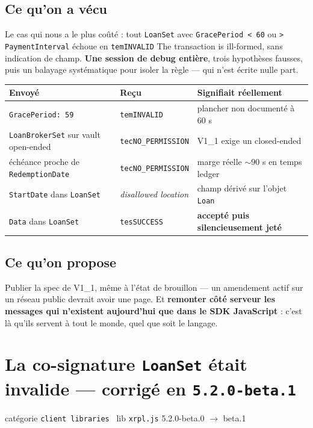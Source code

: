 \documentclass[10pt,a4paper]{article}
\newcommand{\cat}[2]{{\small\textsf{catégorie} \texttt{#1} \textperiodcentered\ \textsf{lib} #2}\par\vspace{2pt}}
\newcommand{\tc}[1]{\texttt{#1}}
\begin{document}
\subsection{Ce qu'on a vécu}
Le cas qui nous a le plus coûté : tout \tc{LoanSet} avec \tc{GracePeriod < 60} ou
\tc{> PaymentInterval} échoue en \tc{temINVALID} \og The transaction is ill-formed\fg{}, sans
indication de champ. \textbf{Une session de debug entière}, trois hypothèses fausses, puis un
balayage systématique pour isoler la règle --- qui n'est écrite nulle part.

\vspace{2pt}
{\small\begin{tabularx}{\linewidth}{@{}llX@{}}
\toprule
\textbf{Envoyé} & \textbf{Reçu} & \textbf{Signifiait réellement}\\
\midrule
\tc{GracePeriod: 59} & \tc{temINVALID} & plancher non documenté à 60 s\\
\tc{LoanBrokerSet} sur vault open-ended & \tc{tecNO\_PERMISSION} & V1\_1 exige un closed-ended\\
échéance proche de \tc{RedemptionDate} & \tc{tecNO\_PERMISSION} & marge réelle $\sim$90 s en temps ledger\\
\tc{StartDate} dans \tc{LoanSet} & \emph{disallowed location} & champ dérivé sur l'objet \tc{Loan}\\
\tc{Data} dans \tc{LoanSet} & \tc{tesSUCCESS} & \textbf{accepté puis silencieusement jeté}\\
\bottomrule
\end{tabularx}\par}
\vspace{3pt}

\subsection{Ce qu'on propose}
Publier la spec de V1\_1, même à l'état de brouillon --- un amendement actif sur un réseau public
devrait avoir une page. Et \textbf{remonter côté serveur les messages qui n'existent aujourd'hui
que dans le SDK JavaScript} : c'est là qu'ils servent à tout le monde, quel que soit le langage.

\section{La co-signature \texttt{LoanSet} était invalide --- corrigé en \texttt{5.2.0-beta.1}}
\cat{client libraries}{\tc{xrpl.js} 5.2.0-beta.0 $\rightarrow$ beta.1}
\end{document}
